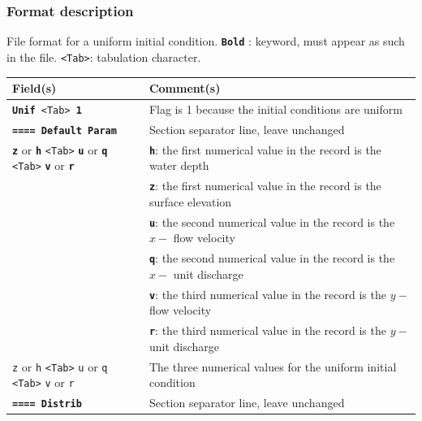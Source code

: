 \subsubsection{Format description}
%
File format for a uniform initial condition.  \texttt{\textbf{Bold}} : keyword, must appear as such in the file. \texttt{<Tab>}: tabulation character. \\
    \begin{tabular}{p{6cm} | p{9cm}}
    \hline
    Field(s) & Comment(s) \\
    \hline  \hline
    \texttt{\textbf{Unif} <Tab> \textbf{1}} & Flag is 1 because the initial conditions are uniform \\ \hline
    \texttt{\textbf{==== Default Param}} & Section separator line, leave unchanged \\  \hline
    \texttt{\textbf{z}} or \texttt{\textbf{h}} \texttt{<Tab>} \texttt{\textbf{u}} or \texttt{\textbf{q}} \texttt{<Tab>} \texttt{\textbf{v}} or \texttt{\textbf{r}} & \texttt{\textbf{h}}: the first numerical value in the record is the water depth \\ 
     & \texttt{\textbf{z}}: the first numerical value in the record is the surface elevation \\
     & \texttt{\textbf{u}}: the second numerical value in the record is the $x-$ flow velocity\\ 
     & \texttt{\textbf{q}}: the second numerical value in the record is the $x-$ unit discharge\\ 
     & \texttt{\textbf{v}}: the third numerical value in the record is the $y-$ flow velocity\\ 
     & \texttt{\textbf{r}}: the third numerical value in the record is the $y-$ unit discharge\\ 
    \hline
     \texttt{z} or \texttt{h} \texttt{<Tab>} \texttt{u} or \texttt{q} \texttt{<Tab>} \texttt{v} or \texttt{r} & The three numerical values for the uniform initial condition \\      
     \texttt{\textbf{==== Distrib}} & Section separator line, leave unchanged \\  
     \hline
    \end{tabular}
%
\vspace{10pt}

